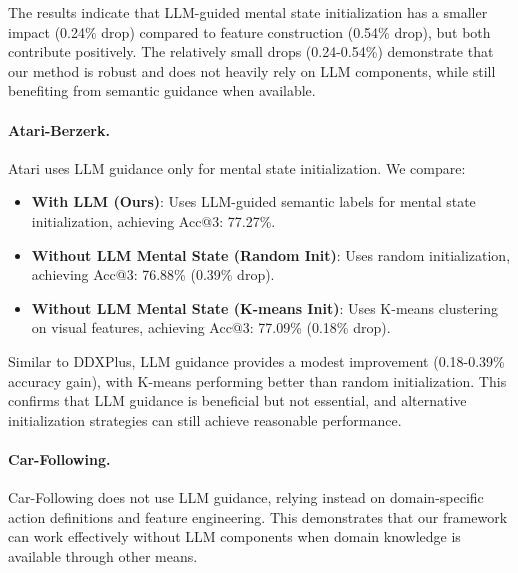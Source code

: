 \documentclass{article} %
\newcommand{\revise}[1]{#1}
\begin{document}
\revise{The results indicate that LLM-guided mental state initialization has a smaller impact (0.24\% drop) compared to feature construction (0.54\% drop), but both contribute positively. The relatively small drops (0.24-0.54\%) demonstrate that our method is robust and does not heavily rely on LLM components, while still benefiting from semantic guidance when available.}
\revise{\paragraph{Atari-Berzerk.}
Atari uses LLM guidance only for mental state initialization. We compare:
\begin{itemize}
    \item \textbf{With LLM (Ours)}: Uses LLM-guided semantic labels for mental state initialization, achieving Acc@3: 77.27\%.
    \item \textbf{Without LLM Mental State (Random Init)}: Uses random initialization, achieving Acc@3: 76.88\% (0.39\% drop).
    \item \textbf{Without LLM Mental State (K-means Init)}: Uses K-means clustering on visual features, achieving Acc@3: 77.09\% (0.18\% drop).
\end{itemize}}
\revise{Similar to DDXPlus, LLM guidance provides a modest improvement (0.18-0.39\% accuracy gain), with K-means performing better than random initialization. This confirms that LLM guidance is beneficial but not essential, and alternative initialization strategies can still achieve reasonable performance.}
\revise{\paragraph{Car-Following.}
Car-Following does not use LLM guidance, relying instead on domain-specific action definitions and feature engineering. This demonstrates that our framework can work effectively without LLM components when domain knowledge is available through other means.}
\end{document}

